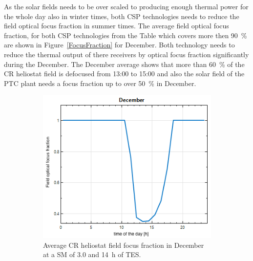 As the solar fields needs to be over scaled to producing enough thermal power for the whole day also in winter times, both CSP technologies needs to reduce the field optical focus fraction in summer times. The average field optical focus fraction, for both CSP technologies from the Table which covers more then 90~\% are shown in Figure~\ref{FocusFraction} for December. Both technology needs to reduce the thermal output of there receivers by optical focus fraction significantly during the December. The December average shows that more than 60~\% of the CR heliostat field is defocused from 13:00 to 15:00 and also the solar field of the PTC plant needs a focus fraction up to over 50~\% in December. 
\begin{figure}[!htbp]
        \centering                
        \begin{subfigure}[b]{0.5\textwidth}
                \centering
                \includegraphics[width=1\textwidth]{FIG/FocusFraction/DecemberCR}
                \caption{Average CR heliostat field focus fraction in December at a SM of 3.0 and 14~h of TES.}\label{DecemberCR}
        \end{subfigure}%
        ~
        \begin{subfigure}[b]{0.5\textwidth}
                \centering

\end{subfigure}
\end{figure}
